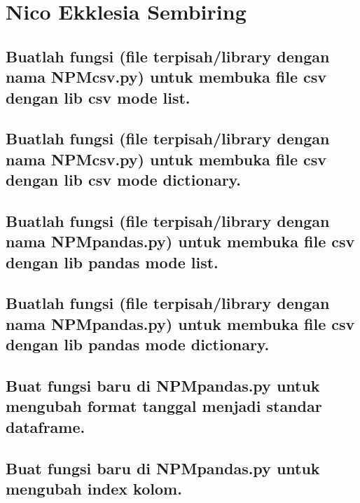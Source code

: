 \section{Nico Ekklesia Sembiring}
\subsection{Buatlah  fungsi  (file  terpisah/library  dengan  nama  NPMcsv.py)  untuk  membuka file csv dengan lib csv mode list.}


\subsection{Buatlah  fungsi  (file  terpisah/library  dengan  nama  NPMcsv.py)  untuk  membuka file csv dengan lib csv mode dictionary.}


\subsection{Buatlah fungsi (file terpisah/library dengan nama NPMpandas.py) untuk membuka file csv dengan lib pandas mode list.}


\subsection{Buatlah fungsi (file terpisah/library dengan nama NPMpandas.py) untuk membuka file csv dengan lib pandas mode dictionary.}


\subsection{Buat fungsi baru di NPMpandas.py untuk mengubah format tanggal menjadi standar dataframe.}


\subsection{Buat fungsi baru di NPMpandas.py untuk mengubah index kolom.}


